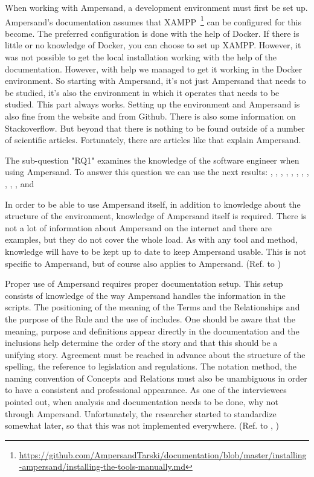 When working with Ampersand, a development environment must first be set up. 
Ampersand's documentation assumes that XAMPP~\footnote{\url{https://github.com/AmpersandTarski/documentation/blob/master/installing-ampersand/installing-the-tools-manually.md}} can be configured for this become.
The preferred configuration is done with the help of Docker.
If there is little or no knowledge of Docker, you can choose to set up XAMPP.
However, it was not possible to get the local installation working with the help of the documentation.
However, with help we managed to get it working in the Docker environment.
So starting with Ampersand, it's not just Ampersand that needs to be studied, it's also the environment in which it operates that needs to be studied.
This part always works.
Setting up the environment and Ampersand is also fine from the website and from Github.
There is also some information on Stackoverflow.
But beyond that there is nothing to be found outside of a number of scientific articles.
Fortunately, there are articles like \cite{de_swart_ampersand_2011} that explain Ampersand.

The sub-question "\acrlong{RQ1}" examines the knowledge of the software engineer when using Ampersand.
To answer this question we can use the next results: , , , , , , , , , , ,  and 


In order to be able to use Ampersand itself, in addition to knowledge about the structure of the environment, knowledge of Ampersand itself is required.
There is not a lot of information about Ampersand on the internet and there are examples, but they do not cover the whole load.
As with any tool and method, knowledge will have to be kept up to date to keep Ampersand usable.
This is not specific to Ampersand, but of course also applies to Ampersand.
(Ref. to )


Proper use of Ampersand requires proper documentation setup.
This setup consists of knowledge of the way Ampersand handles the information in the scripts.
The positioning of the meaning of the Terms and the Relationships and the purpose of the Rule and the use of includes.
One should be aware that the meaning, purpose and definitions appear directly in the documentation and the inclusions help determine the order of the story and that this should be a unifying story.
Agreement must be reached in advance about the structure of the spelling, the reference to legislation and regulations.
The notation method, the naming convention of Concepts and Relations must also be unambiguous in order to have a consistent and professional appearance.
As one of the interviewees pointed out, when analysis and documentation needs to be done, why not through Ampersand.
Unfortunately, the researcher started to standardize somewhat later, so that this was not implemented everywhere.
(Ref. to , )


